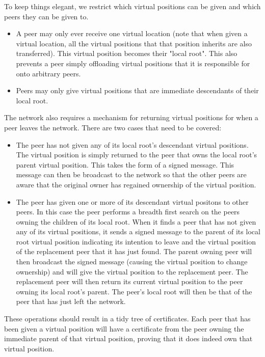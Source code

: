 \documentclass[ %
                    author={Luke Murray},
                supervisor={Dr. Simon Hollis},
                     title={Shadow Peer-to-Peer Networks},
                  subtitle={},
                    degree={MEng},
                      year={2013} ]{thesis}
\begin{document}
To keep things elegant, we restrict which virtual positions can be given and which peers they can be given to.
\begin{itemize}
\item A peer may only ever receive one virtual location (note that when given a virtual location, all the virtual positions that that position inherits are also transferred). This virtual position becomes their "local root". This also prevents a peer simply offloading virtual positions that it is responsible for onto arbitrary peers.
\item Peers may only give virtual positions that are immediate descendants of their local root.
\end{itemize}

The network also requires a mechanism for returning virtual positions for when a peer leaves the network. There are two cases that need to be covered:
\begin{itemize}
\item The peer has not given any of its local root's descendant virtual positions. The virtual position is simply returned to the peer that owns the local root's parent virtual position. This takes the form of a signed message. This message can then be broadcast to the network so that the other peers are aware that the original owner has regained ownership of the virtual position.
\item The peer has given one or more of its descendant virtual positons to other peers. In this case the peer performs a breadth first search on the peers owning the children of its local root. When it finds a peer that has not given any of its virtual positions, it sends a signed message to the parent of its local root virtual position indicating its intention to leave and the virtual position of the replacement peer that it has just found. The parent owning peer will then broadcast the signed message (causing the virtual position to change ownership) and will give the virtual position to the replacement peer. The replacement peer will then return its current virtual position to the peer owning its local root's parent. The peer's local root will then be that of the peer that has just left the network.
\end{itemize}

These operations should result in a tidy tree of certificates. Each peer that has been given a virtual position will have a certificate from the peer owning the immediate parent of that virtual position, proving that it does indeed own that virtual position.
\end{document}
